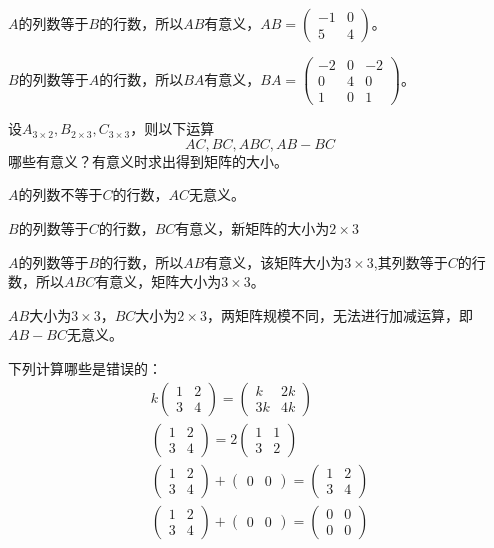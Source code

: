 \documentclass[a4paper]{report}
\begin{document}
\begin{jie}
$A$的列数等于$B$的行数，所以$AB$有意义，$AB=
\begin{pmatrix}
-1& 0\\ 5&4
\end{pmatrix}
$。

$B$的列数等于$A$的行数，所以$BA$有意义，$BA=
\begin{pmatrix}
-2&0&-2\\ 0&4&0\\ 1&0&1
\end{pmatrix}
$。
\end{jie}

\EX 设$A_{3\times 2},B_{2\times 3},C_{3\times 3}$，则以下运算
\begin{equation*}
  AC,BC,ABC,AB-BC
\end{equation*}
哪些有意义？有意义时求出得到矩阵的大小。

\begin{jie}
$A$的列数不等于$C$的行数，$AC$无意义。

$B$的列数等于$C$的行数，$BC$有意义，新矩阵的大小为$2\times 3$

$A$的列数等于$B$的行数，所以$AB$有意义，该矩阵大小为$3\times 3$,其列数等于$C$的行数，所以$ABC$有意义，矩阵大小为$3\times 3$。

$AB$大小为$3\times 3$，$BC$大小为$2\times 3$，两矩阵规模不同，无法进行加减运算，即$AB-BC$无意义。
\end{jie}

\EX 下列计算哪些是错误的：
\begin{gather*}
k\begin{pmatrix}
   1&2\\ 3&4
 \end{pmatrix}=\begin{pmatrix}
   k&2k\\ 3k&4k
 \end{pmatrix}\\
\begin{pmatrix}
   1&2\\ 3&4
 \end{pmatrix}=2\begin{pmatrix}
   1&1\\ 3&2
 \end{pmatrix}\\
 \begin{pmatrix}
   1&2\\ 3&4
 \end{pmatrix}+
 \begin{pmatrix}
   0&0
 \end{pmatrix}=\begin{pmatrix}
   1&2\\ 3&4
 \end{pmatrix}\\
  \begin{pmatrix}
   1&2\\ 3&4
 \end{pmatrix}+
 \begin{pmatrix}
   0&0
 \end{pmatrix}=\begin{pmatrix}
   0&0\\ 0&0
 \end{pmatrix}
\end{gather*}
\end{document}
